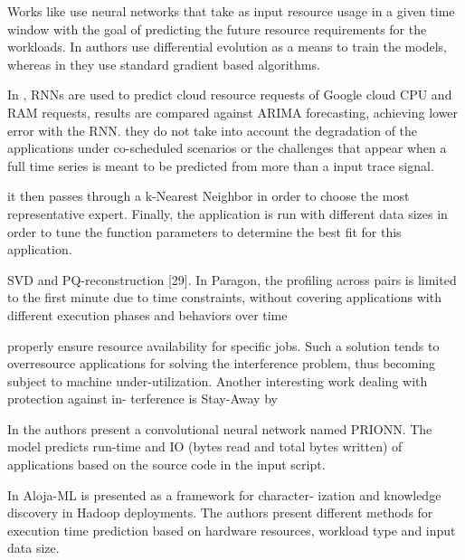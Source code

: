 \documentclass[8pt,UTF8]{article}
\begin{document}
                Works like \cite{islam2012empirical, kumar2018workload} use neural networks that take as input resource usage in a given time window with the goal of predicting the future resource requirements for the workloads. In authors use differential evolution as a means to train the models, whereas in they use standard gradient based algorithms.
                
                In \cite{zhang2016workload}, RNNs are used to predict cloud resource requests of Google cloud CPU and RAM requests, results are compared against ARIMA forecasting, achieving lower error with the RNN. they do not take into account the degradation of the applications under co-scheduled scenarios or the challenges that appear when a full time series is meant to be predicted from more than a input trace signal.
                
                \cite{marco2017improving} it then passes through a k-Nearest Neighbor in order to choose the most representative expert. Finally, the application is run with different data sizes in order to tune the function parameters to determine the best fit for this application. 
                
                SVD and PQ-reconstruction [29]. In Paragon, the profiling across pairs is limited to the first minute due to time constraints, without covering applications with different execution phases and behaviors over time
                
                properly ensure resource availability for specific jobs. Such a solution tends to overresource applications for solving the interference problem, thus becoming subject to machine under-utilization. Another interesting work dealing with protection against in- terference is Stay-Away by \cite{rameshan2014stay}
                
                In \cite{wyatt2018prionn} the authors present a convolutional neural network named PRIONN. The model predicts run-time and IO (bytes read and total bytes written) of applications based on the source code in the input script. 
                
                In \cite{berral2015aloja} Aloja-ML is presented as a framework for character- ization and knowledge discovery in Hadoop deployments. The authors present different methods for execution time prediction based on hardware resources, workload type and input data size.
                
\end{document}

